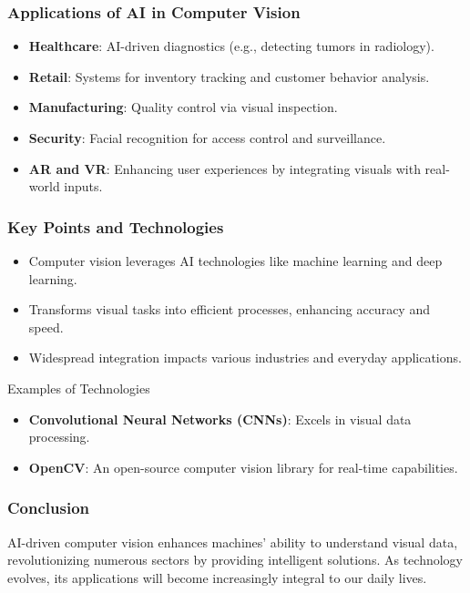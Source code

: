 \documentclass[aspectratio=169]{beamer}
\begin{document}
\begin{frame}[fragile]
    \frametitle{Applications of AI in Computer Vision}
    \begin{itemize}
        \item \textbf{Healthcare}: AI-driven diagnostics (e.g., detecting tumors in radiology).
        \item \textbf{Retail}: Systems for inventory tracking and customer behavior analysis.
        \item \textbf{Manufacturing}: Quality control via visual inspection.
        \item \textbf{Security}: Facial recognition for access control and surveillance.
        \item \textbf{AR and VR}: Enhancing user experiences by integrating visuals with real-world inputs.
    \end{itemize}
\end{frame}

\begin{frame}[fragile]
    \frametitle{Key Points and Technologies}
    \begin{itemize}
        \item Computer vision leverages AI technologies like machine learning and deep learning.
        \item Transforms visual tasks into efficient processes, enhancing accuracy and speed.
        \item Widespread integration impacts various industries and everyday applications.
    \end{itemize}
    \begin{block}{Examples of Technologies}
        \begin{itemize}
            \item \textbf{Convolutional Neural Networks (CNNs)}: Excels in visual data processing.
            \item \textbf{OpenCV}: An open-source computer vision library for real-time capabilities.
        \end{itemize}
    \end{block}
\end{frame}

\begin{frame}[fragile]
    \frametitle{Conclusion}
    AI-driven computer vision enhances machines' ability to understand visual data, revolutionizing numerous sectors by providing intelligent solutions. As technology evolves, its applications will become increasingly integral to our daily lives.
\end{frame}
\end{document}
